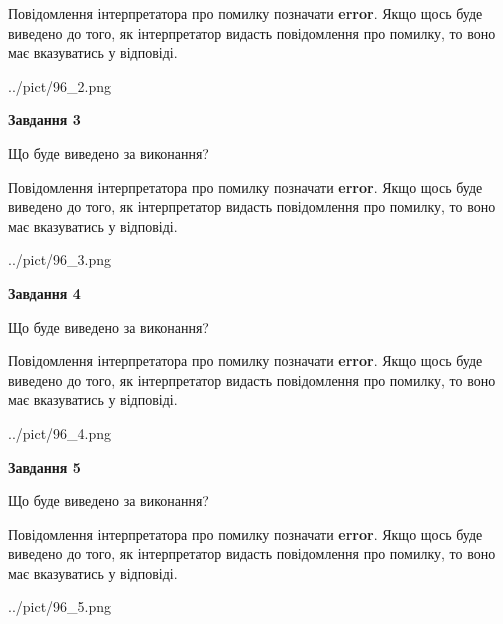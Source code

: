 \documentclass[12pt, ukrainian]{article}
\begin{document}
{\begin {large}
Повідомлення інтерпретатора про помилку позначати \textbf{error}.
Якщо щось буде виведено до того, як інтерпретатор видасть повідомлення про помилку, 
то воно має вказуватись у відповіді. \par


\begin{center}
	{../pict/96_2.png}
\end{center}
\newpage

{\begin {center}\textbf{Завдання 3}\end {center}}\par
Що буде виведено за виконання?

Повідомлення інтерпретатора про помилку позначати \textbf{error}.
Якщо щось буде виведено до того, як інтерпретатор видасть повідомлення про помилку, 
то воно має вказуватись у відповіді. \par


\begin{center}
	{../pict/96_3.png}
\end{center}
\newpage

{\begin {center}\textbf{Завдання 4}\end {center}}\par
Що буде виведено за виконання?

Повідомлення інтерпретатора про помилку позначати \textbf{error}.
Якщо щось буде виведено до того, як інтерпретатор видасть повідомлення про помилку, 
то воно має вказуватись у відповіді. \par


\begin{center}
	{../pict/96_4.png}
\end{center}
\newpage

{\begin {center}\textbf{Завдання 5}\end {center}}\par
Що буде виведено за виконання?

Повідомлення інтерпретатора про помилку позначати \textbf{error}.
Якщо щось буде виведено до того, як інтерпретатор видасть повідомлення про помилку, 
то воно має вказуватись у відповіді. \par


\begin{center}
	{../pict/96_5.png}
\end{center}
\newpage


\end{large}}
\end{document}
